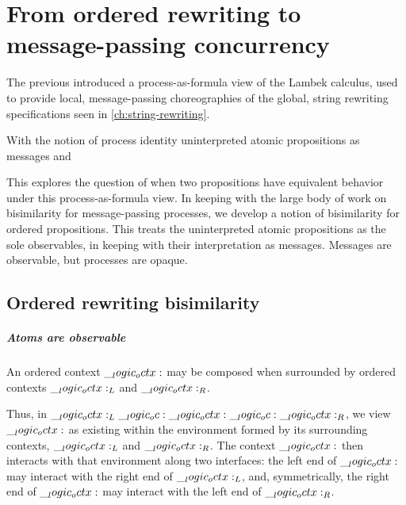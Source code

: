 \chapter{From ordered rewriting to message-passing concurrency}\label{ch:ordered-bisimilarity}

The previous  introduced a process-as-formula view of the Lambek calculus, used to provide local, message-passing choreographies of the global, string rewriting specifications seen in \cref{ch:string-rewriting}.

With the notion of process identity uninterpreted atomic propositions as messages and 

This  explores the question of when two propositions have equivalent behavior under this process-as-formula view.
In keeping with the large body of work on bisimilarity for message-passing processes\autocite{??}, we develop a notion of bisimilarity for ordered propositions.
This  treats the uninterpreted atomic propositions as the sole observables, in keeping with their interpretation as messages.
Messages are observable, but processes are opaque.


\section{}





\section{Ordered rewriting bisimilarity}

\paragraph*{Atoms are observable}

An ordered context $\__logic_octx:$ may be composed when surrounded by ordered contexts $\__logic_octx:_L$ and $\__logic_octx:_R$.

Thus, in $\__logic_octx:_L \__logic_oc: \__logic_octx: \__logic_oc: \__logic_octx:_R$, we view $\__logic_octx:$ as existing within the environment formed by its surrounding contexts, $\__logic_octx:_L$ and $\__logic_octx:_R$.
The context $\__logic_octx:$ then interacts with that environment along two interfaces: the left end of $\__logic_octx:$ may interact with the right end of $\__logic_octx:_L$, and, symmetrically, the right end of $\__logic_octx:$ may interact with the left end of $\__logic_octx:_R$.

